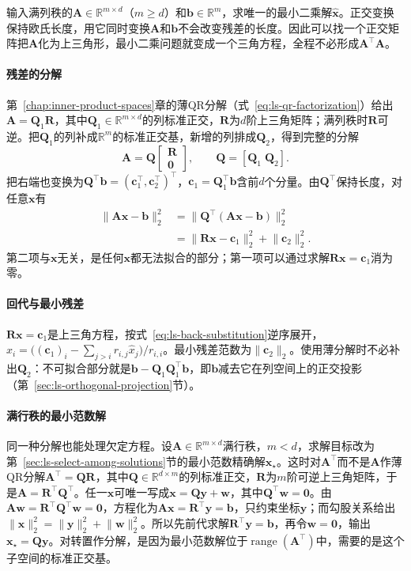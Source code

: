 输入满列秩的$\bm A\in\mathbb R^{m\times d}$（$m\geq d$）和$\bm b\in\mathbb R^m$，求唯一的最小二乘解$\hat{\bm x}$。正交变换保持欧氏长度，用它同时变换$\bm A$和$\bm b$不会改变残差的长度。因此可以找一个正交矩阵把$\bm A$化为上三角形，最小二乘问题就变成一个三角方程，全程不必形成$\bm A^\top\bm A$。

\paragraph{残差的分解}
第~\ref{chap:inner-product-spaces}章的薄QR分解（式~\eqref{eq:ls-qr-factorization}）给出$\bm A=\bm Q_1\bm R$，其中$\bm Q_1\in\mathbb R^{m\times d}$的列标准正交，$\bm R$为$d$阶上三角矩阵；满列秩时$\bm R$可逆。把$\bm Q_1$的列补成$\mathbb R^m$的标准正交基，新增的列排成$\bm Q_2$，得到完整的分解
\[
 \bm A=\bm Q\begin{bmatrix}\bm R\\\bm0\end{bmatrix},\qquad \bm Q=[\bm Q_1\;\bm Q_2].
\]
把右端也变换为$\bm Q^\top\bm b=(\bm c_1^\top,\bm c_2^\top)^\top$，$\bm c_1=\bm Q_1^\top\bm b$含前$d$个分量。由$\bm Q^\top$保持长度，对任意$\bm x$有
\begin{equation}
 \begin{aligned}
 \lVert\bm A\bm x-\bm b\rVert_2^2
 &=\lVert\bm Q^\top(\bm A\bm x-\bm b)\rVert_2^2\\
 &=\lVert\bm R\bm x-\bm c_1\rVert_2^2+\lVert\bm c_2\rVert_2^2 .
 \end{aligned}
 \label{eq:ls-qr-residual-split}
\end{equation}
第二项与$\bm x$无关，是任何$\bm x$都无法拟合的部分；第一项可以通过求解$\bm R\bm x=\bm c_1$消为零。

\paragraph{回代与最小残差}
$\bm R\bm x=\bm c_1$是上三角方程，按式~\eqref{eq:ls-back-substitution}逆序展开，$\hat x_i=\bigl((\bm c_1)_i-\sum_{j>i}r_{i,j}\hat x_j\bigr)/r_{i,i}$。最小残差范数为$\lVert\bm c_2\rVert_2$。使用薄分解时不必补出$\bm Q_2$：不可拟合部分就是$\bm b-\bm Q_1\bm Q_1^\top\bm b$，即$\bm b$减去它在列空间上的正交投影（第~\ref{sec:ls-orthogonal-projection}节）。

\paragraph{满行秩的最小范数解}
同一种分解也能处理欠定方程。设$\bm A\in\mathbb R^{m\times d}$满行秩，$m<d$，求解目标改为第~\ref{sec:ls-select-among-solutions}节的最小范数精确解$\bm x_\star$。这时对$\bm A^\top$而不是$\bm A$作薄QR分解$\bm A^\top=\bm Q\bm R$，其中$\bm Q\in\mathbb R^{d\times m}$的列标准正交，$\bm R$为$m$阶可逆上三角矩阵，于是$\bm A=\bm R^\top\bm Q^\top$。任一$\bm x$可唯一写成$\bm x=\bm Q\bm y+\bm w$，其中$\bm Q^\top\bm w=\bm0$。由$\bm A\bm w=\bm R^\top\bm Q^\top\bm w=\bm0$，方程化为$\bm A\bm x=\bm R^\top\bm y=\bm b$，只约束坐标$\bm y$；而勾股关系给出$\lVert\bm x\rVert_2^2=\lVert\bm y\rVert_2^2+\lVert\bm w\rVert_2^2$。所以先前代求解$\bm R^\top\bm y=\bm b$，再令$\bm w=\bm0$，输出$\bm x_\star=\bm Q\bm y$。对转置作分解，是因为最小范数解位于$\operatorname{range}(\bm A^\top)$中，需要的是这个子空间的标准正交基。

